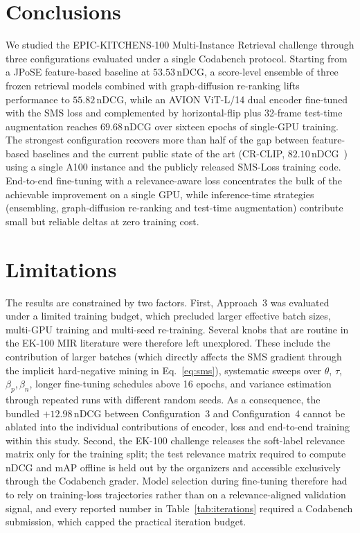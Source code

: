 \section{Conclusions}
\label{sec:conclusions}

We studied the EPIC-KITCHENS-100 Multi-Instance Retrieval challenge through three configurations evaluated under a single Codabench protocol. Starting from a JPoSE feature-based baseline at $53.53$\,nDCG, a score-level ensemble of three frozen retrieval models combined with graph-diffusion re-ranking lifts performance to $55.82$\,nDCG, while an AVION ViT-L/14 dual encoder fine-tuned with the SMS loss and complemented by horizontal-flip plus 32-frame test-time augmentation reaches $69.68$\,nDCG over sixteen epochs of single-GPU training. The strongest configuration recovers more than half of the gap between feature-based baselines and the current public state of the art (CR-CLIP, $82.10$\,nDCG~\cite{he2025crclip}) using a single A100 instance and the publicly released SMS-Loss training code. End-to-end fine-tuning with a relevance-aware loss concentrates the bulk of the achievable improvement on a single GPU, while inference-time strategies (ensembling, graph-diffusion re-ranking and test-time augmentation) contribute small but reliable deltas at zero training cost.

\section{Limitations}
\label{sec:limitations}

The results are constrained by two factors. First, Approach~3 was evaluated under a limited training budget, which precluded larger effective batch sizes, multi-GPU training and multi-seed re-training. Several knobs that are routine in the EK-100 MIR literature were therefore left unexplored. These include the contribution of larger batches (which directly affects the SMS gradient through the implicit hard-negative mining in Eq.~\eqref{eq:sms}), systematic sweeps over $\theta$, $\tau$, $\beta_p, \beta_n$, longer fine-tuning schedules above 16 epochs, and variance estimation through repeated runs with different random seeds. As a consequence, the bundled $+12.98$\,nDCG between Configuration~3 and Configuration~4 cannot be ablated into the individual contributions of encoder, loss and end-to-end training within this study. Second, the EK-100 challenge releases the soft-label relevance matrix only for the training split; the test relevance matrix required to compute nDCG and mAP offline is held out by the organizers and accessible exclusively through the Codabench grader. Model selection during fine-tuning therefore had to rely on training-loss trajectories rather than on a relevance-aligned validation signal, and every reported number in Table~\ref{tab:iterations} required a Codabench submission, which capped the practical iteration budget.


